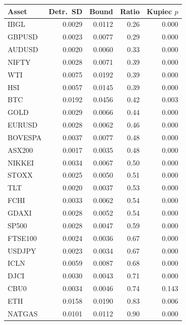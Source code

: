 \begin{tabular}{lrrrr}
\toprule
Asset & Detr.\ SD & Bound & Ratio & Kupiec $p$ \\
\midrule
  IBGL & 0.0029 & 0.0112 & 0.26 & 0.000 \\
  GBPUSD & 0.0023 & 0.0077 & 0.29 & 0.000 \\
  AUDUSD & 0.0020 & 0.0060 & 0.33 & 0.000 \\
  NIFTY & 0.0028 & 0.0071 & 0.39 & 0.000 \\
  WTI & 0.0075 & 0.0192 & 0.39 & 0.000 \\
  HSI & 0.0057 & 0.0145 & 0.39 & 0.000 \\
  BTC & 0.0192 & 0.0456 & 0.42 & 0.003 \\
  GOLD & 0.0029 & 0.0066 & 0.44 & 0.000 \\
  EURUSD & 0.0028 & 0.0062 & 0.46 & 0.000 \\
  BOVESPA & 0.0037 & 0.0077 & 0.48 & 0.000 \\
  ASX200 & 0.0017 & 0.0035 & 0.48 & 0.000 \\
  NIKKEI & 0.0034 & 0.0067 & 0.50 & 0.000 \\
  STOXX & 0.0025 & 0.0050 & 0.51 & 0.000 \\
  TLT & 0.0020 & 0.0037 & 0.53 & 0.000 \\
  FCHI & 0.0033 & 0.0062 & 0.54 & 0.000 \\
  GDAXI & 0.0028 & 0.0052 & 0.54 & 0.000 \\
  SP500 & 0.0028 & 0.0047 & 0.59 & 0.000 \\
  FTSE100 & 0.0024 & 0.0036 & 0.67 & 0.000 \\
  USDJPY & 0.0023 & 0.0034 & 0.67 & 0.000 \\
  ICLN & 0.0059 & 0.0087 & 0.68 & 0.000 \\
  DJCI & 0.0030 & 0.0043 & 0.71 & 0.000 \\
  CBU0 & 0.0034 & 0.0046 & 0.74 & 0.143 \\
  ETH & 0.0158 & 0.0190 & 0.83 & 0.006 \\
  NATGAS & 0.0101 & 0.0112 & 0.90 & 0.000 \\
\bottomrule
\end{tabular}